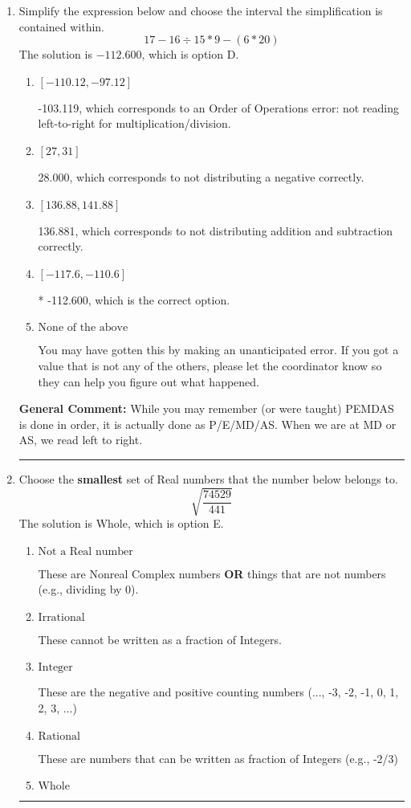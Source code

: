 \documentclass{extbook}[14pt]
\newcommand{\litem}[1]{\item #1

\rule{\textwidth}{0.4pt}}
\begin{document}
\begin{enumerate}\litem{
Simplify the expression below and choose the interval the simplification is contained within.
\[ 17 - 16 \div 15 * 9 - (6 * 20) \]
The solution is \( -112.600 \), which is option D.\begin{enumerate}[label=\Alph*.]
\item \( [-110.12, -97.12] \)

 -103.119, which corresponds to an Order of Operations error: not reading left-to-right for multiplication/division.
\item \( [27, 31] \)

 28.000, which corresponds to not distributing a negative correctly.
\item \( [136.88, 141.88] \)

 136.881, which corresponds to not distributing addition and subtraction correctly.
\item \( [-117.6, -110.6] \)

* -112.600, which is the correct option.
\item \( \text{None of the above} \)

 You may have gotten this by making an unanticipated error. If you got a value that is not any of the others, please let the coordinator know so they can help you figure out what happened.
\end{enumerate}

\textbf{General Comment:} While you may remember (or were taught) PEMDAS is done in order, it is actually done as P/E/MD/AS. When we are at MD or AS, we read left to right.
}
\litem{
Choose the \textbf{smallest} set of Real numbers that the number below belongs to.
\[ \sqrt{\frac{74529}{441}} \]
The solution is \( \text{Whole} \), which is option E.\begin{enumerate}[label=\Alph*.]
\item \( \text{Not a Real number} \)

These are Nonreal Complex numbers \textbf{OR} things that are not numbers (e.g., dividing by 0).
\item \( \text{Irrational} \)

These cannot be written as a fraction of Integers.
\item \( \text{Integer} \)

These are the negative and positive counting numbers (..., -3, -2, -1, 0, 1, 2, 3, ...)
\item \( \text{Rational} \)

These are numbers that can be written as fraction of Integers (e.g., -2/3)
\item \( \text{Whole} \)


\end{enumerate}}
\end{enumerate}
\end{document}

